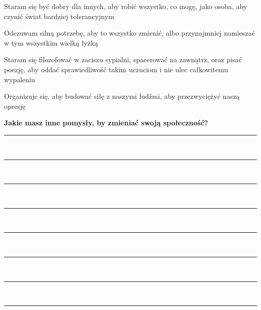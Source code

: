 \begin{multicols}{2}
\begin{checkboxlist}
		\item Staram się być dobry dla innych, aby robić wszystko, co mogę, jako osoba, aby czynić świat bardziej tolerancyjnym
		\item Odczuwam silną potrzebę, aby to wszystko zmienić, albo przynajmniej namieszać w tym wszystkim wielką łyżką
		\item Staram się filozofować w zaciszu sypialni, spacerować na zawnątrz, oraz pisać poezję, aby oddać sprawiedliwość takim uczuciom i nie ulec całkowitemu wypaleniu
		\item Organizuje się, aby budować siłę z naszymi ludźmi, aby przezwyciężyć naszą opresję
	\end{checkboxlist}
\end{multicols}

\noindent\textcolor{ProcessBlue}{\textbf{\LARGE{Jakie masz inne pomysły, by zmieniać swoją społeczność?}}}\\

\noindent\rule{\textwidth}{1pt}\\
\noindent\rule{\textwidth}{1pt}\\
\noindent\rule{\textwidth}{1pt}\\
\noindent\rule{\textwidth}{1pt}\\
\noindent\rule{\textwidth}{1pt}\\
\noindent\rule{\textwidth}{1pt}\\
\noindent\rule{\textwidth}{1pt}\\
\noindent\rule{\textwidth}{1pt}\\\\